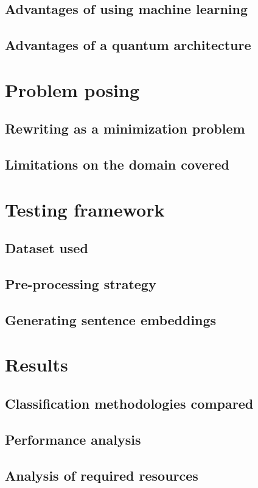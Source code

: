 \documentclass[11pt, oneside]{book}
\begin{document}
\section{Advantages of using machine learning}
\section{Advantages of a quantum architecture}

\chapter{Problem posing}
\section{Rewriting as a minimization problem}
\section{Limitations on the domain covered}

\chapter{Testing framework}
\section{Dataset used}
\section{Pre-processing strategy}
\section{Generating sentence embeddings}

\chapter{Results}
\section{Classification methodologies compared}
\section{Performance analysis}
\section{Analysis of required resources}
\end{document}
